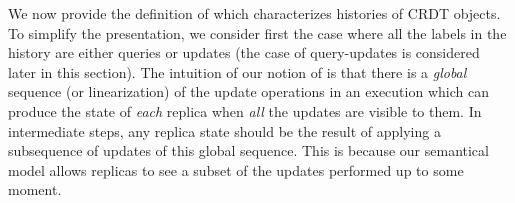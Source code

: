 We now provide the definition of \crdtlin{} which characterizes histories of CRDT objects.
To simplify the presentation, we consider first the case where all the labels in the history are
either queries or updates (the case of query-updates is considered later in this section).
%
%
%
The intuition of our notion of \crdtlin{} is that there is a \emph{global} sequence
(or linearization) of the update operations in an execution which can
produce the state of \emph{each} replica when \emph{all} the updates are visible to them.
In intermediate steps, any replica state should be the result of applying a subsequence of updates
of this global sequence. This is because our semantical model allows replicas to see a subset of the updates
performed up to some moment.

